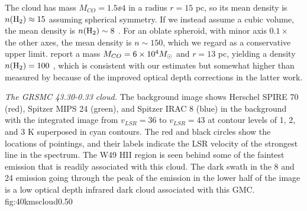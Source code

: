 %
%
% 
% 
% 
The cloud has mass $M_{CO} = 1.5\ee{4}$ \msun in a radius $r=15$ pc, so its
mean density is $n(\textrm{H}_{2}) \approx 15$ \percc assuming spherical symmetry.  If we
instead assume a cubic volume, the mean density is $n(\textrm{H}_{2})\sim8$ \percc.  For
an oblate spheroid, with minor axis $0.1\times$ the other axes, the mean
density is $n\sim150$\percc, which we regard as a conservative upper limit.
\citet{Simon2001a} report a mass $M_{CO} = 6\times10^{4} M_{\odot}$ and $r=13$ pc,
yielding a density $n(\textrm{H}_{2})=100$ \percc, which is consistent with our estimates
but somewhat higher than measured by \citet{Roman-Duval2010a} because of the
improved optical depth corrections in the latter work.


{\textit{The GRSMC 43.30-0.33 cloud.}  The background image shows Herschel SPIRE 70 \um (red),
Spitzer MIPS 24 \um (green), and Spitzer IRAC 8 \um (blue) in the background with
the \thirteenco integrated image from $v_{LSR}=36$ \kms to $v_{LSR}=43$ \kms at contour levels of
1, 2, and 3 K \kms superposed in cyan contours.  The red and black circles
show the locations of \formaldehyde pointings, and their labels indicate the LSR velocity
of the strongest line in the spectrum.  The W49 HII region is seen
behind some of the faintest \thirteenco emission that is readily associated
with this cloud.  The dark swath in the 8 and 24 \um emission going through the
peak of the \thirteenco emission in the lower half of the image is a low
optical depth infrared dark cloud associated with this GMC.}
{fig:40kmscloud}{0.5}{0}


